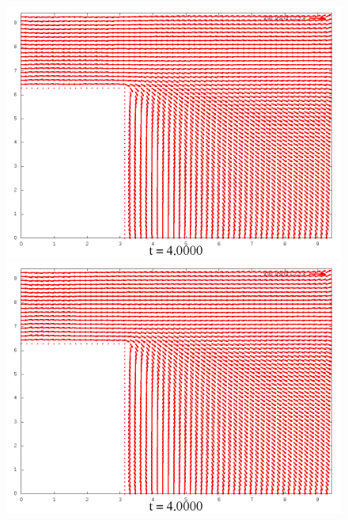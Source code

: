 \documentclass[a4paper, 12pt]{article}
\begin{document}
\begin{figure}[h]
	\begin{minipage}[h]{0.4\linewidth}
		\includegraphics[width=1\linewidth]{./img/01_1_1/V/20}
	\end{minipage}
	\hfill
	\begin{minipage}[h]{0.4\linewidth}
		\includegraphics[width=1\linewidth]{./img/01_1_01/V/20}
	\end{minipage}
\end{figure}
\end{document}
